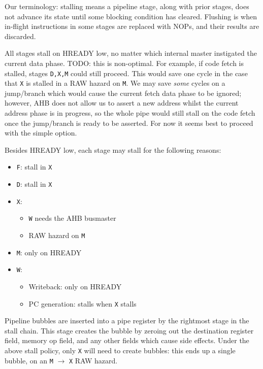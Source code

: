 \documentclass{article}
\begin{document}
Our terminology: stalling means a pipeline stage, along with prior stages, does not advance its state until some blocking condition has cleared. Flushing is when in-flight instructions in some stages are replaced with NOPs, and their results are discarded.

All stages stall on HREADY low, no matter which internal master instigated the current data phase. TODO: this is non-optimal. For example, if code fetch is stalled, stages \texttt{D,X,M} could still proceed. This would save one cycle in the case that \texttt{X} is stalled in a RAW hazard on \texttt{M}. We may save \textit{some} cycles on a jump/branch which would cause the current fetch data phase to be ignored; however, AHB does not allow us to assert a new address whilst the current address phase is in progress, so the whole pipe would still stall on the code fetch once the jump/branch is ready to be asserted. For now it seems best to proceed with the simple option.

Besides HREADY low, each stage may stall for the following reasons:

\begin{itemize}
	\item \texttt{F}: stall in \texttt{X}
	\item \texttt{D}: stall in \texttt{X}
	\item \texttt{X}:
	\begin{itemize}
		\item \texttt{W} needs the AHB busmaster
		\item RAW hazard on \texttt{M}
	\end{itemize}
	\item \texttt{M}: only on HREADY
	\item \texttt{W}:
	\begin{itemize}
		\item Writeback: only on HREADY
		\item PC generation: stalls when \texttt{X} stalls
	\end{itemize}
\end{itemize}

Pipeline bubbles are inserted into a pipe register by the rightmost stage in the stall chain. This stage creates the bubble by zeroing out the destination register field, memory op field, and any other fields which cause side effects. Under the above stall policy, only \texttt{X} will need to create bubbles: this ends up a single bubble, on an \texttt{M} $\to$ \texttt{X} RAW hazard.
\end{document}
